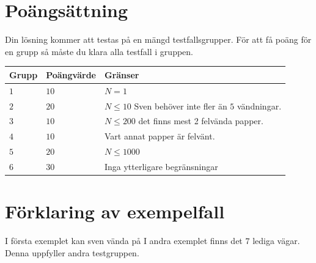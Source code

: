 \section*{Poängsättning}
Din lösning kommer att testas på en mängd testfallsgrupper.
För att få poäng för en grupp så måste du klara alla testfall i gruppen.

\noindent
\begin{tabular}{| l | l | p{12cm} |}
  \hline
  Grupp & Poängvärde & Gränser \\ \hline
  $1$   & $10$       & $N=1$ \\ \hline
  $2$   & $20$       & $N \leq 10$ Sven behöver inte fler än $5$ vändningar. \\ \hline
  $3$   & $10$       & $N \leq 200$ det finns mest 2 felvända papper. \\ \hline
  $4$   & $10$       & Vart annat papper är felvänt. \\ \hline
  $5$   & $20$       & $N \leq 1000$ \\ \hline
  $6$   & $30$       & Inga ytterligare begränsningar  \\ \hline
\end{tabular}



\section*{Förklaring av exempelfall}
I första exemplet kan sven vända på 
I andra exemplet finns det $7$ lediga vägar. Denna uppfyller andra testgruppen.
